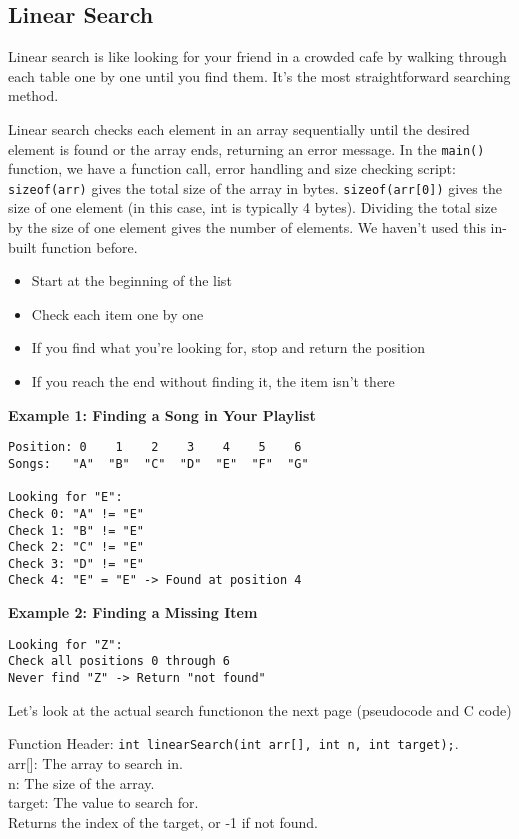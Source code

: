 \documentclass[a4paper,12pt]{article}
\begin{document}
\newpage

\subsection{Linear Search}

Linear search is like looking for your friend in a crowded cafe by walking through each table one by one until you find them. It's the most straightforward searching method.

Linear search checks each element in an array sequentially until the desired element is found or the array ends, returning an error message. In the \verb|main()| function, we have a function call, error handling and size checking script: \verb|sizeof(arr)| gives the total size of the array in bytes. \verb|sizeof(arr[0])| gives the size of one element (in this case, int is typically 4 bytes). Dividing the total size by the size of one element gives the number of elements. We haven't used this in-built function before.

\begin{itemize}
    \item Start at the beginning of the list
    \item Check each item one by one
    \item If you find what you're looking for, stop and return the position
    \item If you reach the end without finding it, the item isn't there
\end{itemize}

\textbf{Example 1: Finding a Song in Your Playlist}
\begin{verbatim}
Position: 0    1    2    3    4    5    6
Songs:   "A"  "B"  "C"  "D"  "E"  "F"  "G"

Looking for "E":
Check 0: "A" != "E"
Check 1: "B" != "E"
Check 2: "C" != "E"
Check 3: "D" != "E"
Check 4: "E" = "E" -> Found at position 4
\end{verbatim}

\textbf{Example 2: Finding a Missing Item}
\begin{verbatim}
Looking for "Z":
Check all positions 0 through 6
Never find "Z" -> Return "not found"
\end{verbatim}

Let's look at the actual search functionon the next page (pseudocode and C code)

\newpage

Function Header: \verb|int linearSearch(int arr[], int n, int target);|.\\ 
arr[]: The array to search in.\\
n: The size of the array.\\
target: The value to search for.\\
Returns the index of the target, or -1 if not found.
\end{document}
